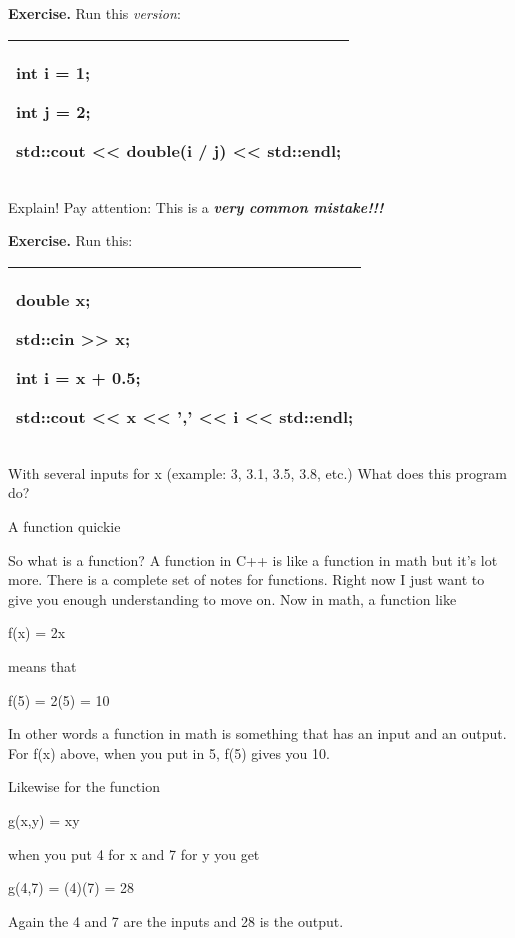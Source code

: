 \documentclass[
]{article}
\begin{document}
\textbf{Exercise.} Run this \emph{version}:

\begin{longtable}[]{@{}l@{}}
\toprule
\endhead
\begin{minipage}[t]{0.97\columnwidth}\raggedright
int i = 1;

int j = 2;

std::cout \textless\textless{} double(i / j) \textless\textless{}
std::endl;\strut
\end{minipage}\tabularnewline
\bottomrule
\end{longtable}

Explain! Pay attention: This is a \emph{\textbf{very common mistake!!!}}

\textbf{Exercise.} Run this:

\begin{longtable}[]{@{}l@{}}
\toprule
\endhead
\begin{minipage}[t]{0.97\columnwidth}\raggedright
double x;

std::cin \textgreater\textgreater{} x;

int i = x + 0.5;

std::cout \textless\textless{} x \textless\textless{} ','
\textless\textless{} i \textless\textless{} std::endl;\strut
\end{minipage}\tabularnewline
\bottomrule
\end{longtable}

With several inputs for x (example: 3, 3.1, 3.5, 3.8, etc.) What does
this program do?

A function quickie

So what is a function? A function in C++ is like a function in math but
it's lot more. There is a complete set of notes for functions. Right now
I just want to give you enough understanding to move on. Now in math, a
function like

f(x) = 2x

means that

f(5) = 2(5) = 10

In other words a function in math is something that has an input and an
output. For f(x) above, when you put in 5, f(5) gives you 10.

Likewise for the function

g(x,y) = xy

when you put 4 for x and 7 for y you get

g(4,7) = (4)(7) = 28

Again the 4 and 7 are the inputs and 28 is the output.
\end{document}
